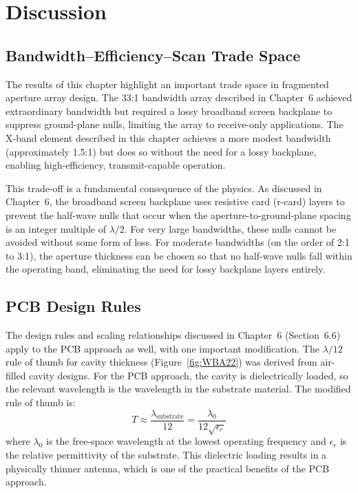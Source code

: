 \section{Discussion}

\subsection{Bandwidth--Efficiency--Scan Trade Space}

The results of this chapter highlight an important trade space in fragmented aperture array design.  The 33:1 bandwidth array described in Chapter~6 achieved extraordinary bandwidth but required a lossy broadband screen backplane to suppress ground-plane nulls, limiting the array to receive-only applications.  The X-band element described in this chapter achieves a more modest bandwidth (approximately 1.5:1) but does so without the need for a lossy backplane, enabling high-efficiency, transmit-capable operation.

This trade-off is a fundamental consequence of the physics.  As discussed in Chapter~6, the broadband screen backplane uses resistive card (r-card) layers to prevent the half-wave nulls that occur when the aperture-to-ground-plane spacing is an integer multiple of $\lambda/2$.  For very large bandwidths, these nulls cannot be avoided without some form of loss.  For moderate bandwidths (on the order of 2:1 to 3:1), the aperture thickness can be chosen so that no half-wave nulls fall within the operating band, eliminating the need for lossy backplane layers entirely.

\subsection{PCB Design Rules}

The design rules and scaling relationships discussed in Chapter~6 (Section~6.6) apply to the PCB approach as well, with one important modification.  The $\lambda/12$ rule of thumb for cavity thickness (Figure~\ref{fig:WBA22}) was derived from air-filled cavity designs.  For the PCB approach, the cavity is dielectrically loaded, so the relevant wavelength is the wavelength in the substrate material.  The modified rule of thumb is:
\begin{equation}
\label{eq:WSAthickness}
T \approx \frac{\lambda_{\text{substrate}}}{12} = \frac{\lambda_0}{12\sqrt{\epsilon_r}}
\end{equation}
where $\lambda_0$ is the free-space wavelength at the lowest operating frequency and $\epsilon_r$ is the relative permittivity of the substrate.  This dielectric loading results in a physically thinner antenna, which is one of the practical benefits of the PCB approach.

